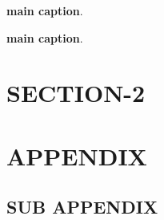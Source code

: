 \documentclass[12pt, lettersize]{article}
\begin{document}
\begin{table}[H]
  \centering
  \small
  
  \caption[main caption]
  {
      \textbf{main caption}.
      \blindtext
  }
  \label{table:}
\end{table}

\begin{table}[H]
  \centering
  \small
  
  \caption[main caption]
  {
      \textbf{main caption}.
      \blindtext
  }
  \label{table:}
\end{table}

\section{SECTION-2}
\lipsum[1]
\cite{smit54,colu92,gree00,phil99,jame76}

\newpage
\printbibliography


\newpage
\appendix
\section{APPENDIX}
\lipsum[1]

\subsection{SUB APPENDIX}
\lipsum[1-2]

\end{document}
